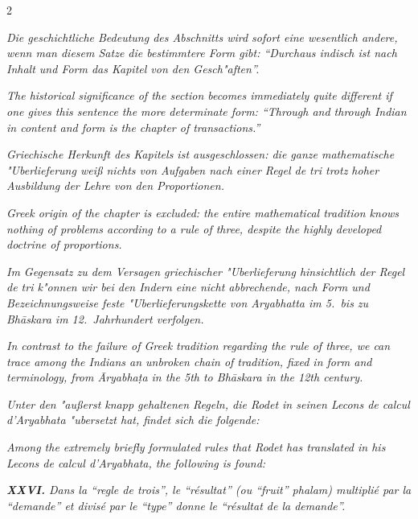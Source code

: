 \documentclass[10pt,a4paper]{article}
\newcommand{\enquote}[1]{``#1''}
\begin{document}
\begin{paracol}{2}
\switchcolumn*

\textit{Die geschichtliche Bedeutung des Abschnitts wird sofort eine wesentlich andere, wenn man diesem Satze die bestimmtere Form gibt: \enquote{Durchaus indisch ist nach Inhalt und Form das Kapitel von den Gesch"aften}.}

\switchcolumn

\textit{The historical significance of the section becomes immediately quite different if one gives this sentence the more determinate form: \enquote{Through and through Indian in content and form is the chapter of transactions.}}

\switchcolumn*

\textit{Griechische Herkunft des Kapitels ist ausgeschlossen: die ganze mathematische "Uberlieferung wei\ss{} nichts von Aufgaben nach einer Regel de tri trotz hoher Ausbildung der Lehre von den Proportionen.}

\switchcolumn

\textit{Greek origin of the chapter is excluded: the entire mathematical tradition knows nothing of problems according to a rule of three, despite the highly developed doctrine of proportions.}

\switchcolumn*

\textit{Im Gegensatz zu dem Versagen griechischer "Uberlieferung hinsichtlich der Regel de tri k"onnen wir bei den Indern eine nicht abbrechende, nach Form und Bezeichnungsweise feste "Uberlieferungskette von Aryabhatta im 5.\ bis zu Bh\=askara im 12.\ Jahrhundert verfolgen.}

\switchcolumn

\textit{In contrast to the failure of Greek tradition regarding the rule of three, we can trace among the Indians an unbroken chain of tradition, fixed in form and terminology, from \=Aryabha\d{t}a in the 5th to Bh\=askara in the 12th century.}

\switchcolumn*

\textit{Unter den "au\ss{}erst knapp gehaltenen Regeln, die Rodet in seinen \textit{Lecons de calcul d'Aryabhata} "ubersetzt hat, findet sich die folgende:}

\switchcolumn

\textit{Among the extremely briefly formulated rules that Rodet has translated in his \textit{Lecons de calcul d'Aryabhata}, the following is found:}

\switchcolumn*

\textit{\textbf{XXVI.} \textit{Dans la \enquote{regle de trois}, le \enquote{r\'esultat} (ou \enquote{fruit} \textit{phalam}) multipli\'e par la \enquote{demande} et divis\'e par le \enquote{type} donne le \enquote{r\'esultat de la demande}.}}


\end{paracol}
\end{document}

